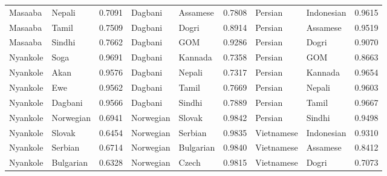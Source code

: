 \documentclass[11pt]{article} %
\begin{document}
\begin{table}
\begin{tabular}{llr@{\hspace{12pt}}llr@{\hspace{12pt}}llr}
            Masaaba                      & Nepali              & 0.7091        & Dagbani             & Assamese            & 0.7808        & Persian             & Indonesian          & 0.9615        \\
            Masaaba                      & Tamil               & 0.7509        & Dagbani             & Dogri               & 0.8914        & Persian             & Assamese            & 0.9519        \\
            Masaaba                      & Sindhi              & 0.7662        & Dagbani             & GOM                 & 0.9286        & Persian             & Dogri               & 0.9070        \\
            Nyankole                     & Soga                & 0.9691        & Dagbani             & Kannada             & 0.7358        & Persian             & GOM                 & 0.8663        \\
            Nyankole                     & Akan                & 0.9576        & Dagbani             & Nepali              & 0.7317        & Persian             & Kannada             & 0.9654        \\
            Nyankole                     & Ewe                 & 0.9562        & Dagbani             & Tamil               & 0.7669        & Persian             & Nepali              & 0.9603        \\
            Nyankole                     & Dagbani             & 0.9566        & Dagbani             & Sindhi              & 0.7889        & Persian             & Tamil               & 0.9667        \\
            Nyankole                     & Norwegian           & 0.6941        & Norwegian           & Slovak              & 0.9842        & Persian             & Sindhi              & 0.9498        \\
            Nyankole                     & Slovak              & 0.6454        & Norwegian           & Serbian             & 0.9835        & Vietnamese          & Indonesian          & 0.9310        \\
            Nyankole                     & Serbian             & 0.6714        & Norwegian           & Bulgarian           & 0.9840        & Vietnamese          & Assamese            & 0.8412        \\
            Nyankole                     & Bulgarian           & 0.6328        & Norwegian           & Czech               & 0.9815        & Vietnamese          & Dogri               & 0.7073        \\

\end{tabular}
\end{table}
\end{document}
